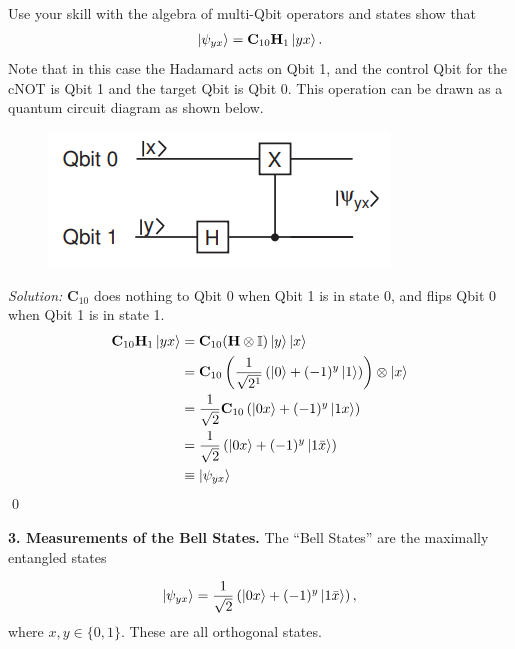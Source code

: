 \documentclass{book}
\theoremstyle{definition}
\newcommand{\nn}{\nonumber}
\newcommand{\f}[2]{\frac{#1}{#2}}
\newcommand{\lp}{\left(}
\newcommand{\rp}{\right)}
\newcommand{\Id}{\mathbb{I}}
\newcommand{\had}{\mathbf{H}}
\begin{document}
\noindent Use your skill with the algebra of multi-Qbit operators and states show that
\begin{align}
\ket{\psi_{yx}} = \mathbf{C}_{10} \had_1 \ket{yx}.
\end{align}
Note that in this case the Hadamard acts on Qbit 1, and the control Qbit for the cNOT is
Qbit 1 and the target Qbit is Qbit 0. This operation can be drawn as a quantum circuit diagram as shown below.
\begin{figure}[!htb]
	\centering
	\includegraphics[scale=0.5]{entang}
\end{figure}



\noindent \textit{Solution:} $\mathbf{C}_{10}$ does nothing to Qbit 0 when Qbit 1 is in state 0, and flips Qbit 0 when Qbit 1 is in state 1. 
\begin{align}
\mathbf{C}_{10}\had_1 \ket{yx} &= \mathbf{C}_{10} (\had \otimes \Id) \ket{y}\ket{x}\nn\\
&= \mathbf{C}_{10} \lp \f{1}{\sqrt{2^1}}\lp \ket{0} + (-1)^y\ket{1} \rp \rp \otimes \ket{x}\nn\\
&= \f{1}{\sqrt{2}} \mathbf{C}_{10}\lp \ket{0x} + (-1)^y \ket{1 x} \rp\nn\\
&= \f{1}{\sqrt{2}} \lp \ket{0 x} + (-1)^y \ket{1\bar{x}} \rp\nn\\
&\equiv \ket{\psi_{yx}}
\end{align}\qed






           
\newpage












\noindent \textbf{3. Measurements of the Bell States.} The ``Bell States'' are the maximally entangled states

\begin{align}
\ket{\psi_{yx}} = \f{1}{\sqrt{2}}\lp \ket{0x} + (-1)^y\ket{1\bar{x}} \rp,
\end{align}
where $x,y \in \{0,1\}$. These are all orthogonal states. \\
\end{document}
